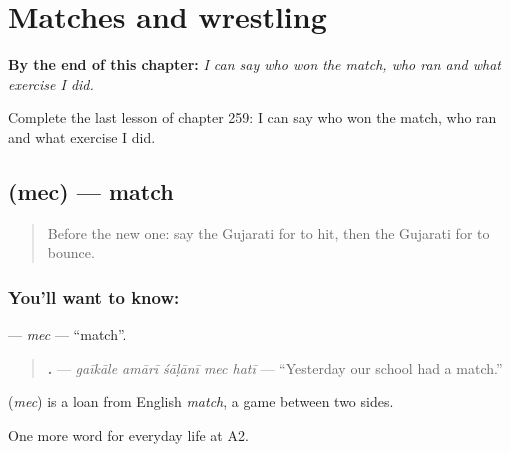 
\chapter{Matches and wrestling}
\label{ch:gu-matches-and-wrestling}

\begin{chapteropening}
\textbf{By the end of this chapter:} \emph{I can say who won the match, who ran and what exercise I did.}

Complete the last lesson of chapter 259: I can say who won the match, who ran and what exercise I did.
\end{chapteropening}

\section[\texorpdfstring{\gu{મેચ} (mec)}{મેચ (mec)}]{ (mec) — match}

\label{lesson:GU-C259-mec}



\begin{quote}
Before the new one: say the Gujarati for to hit, then the Gujarati for to bounce.
\end{quote}

\subsection*{You'll want to know: }
\textbf{} — \emph{mec} — \textquotedblleft{}match\textquotedblright{}.

\begin{quote}
\textbf{    .} — \emph{gaīkāle amārī śāḷānī mec hatī} — \textquotedblleft{}Yesterday our school had a match.\textquotedblright{}
\end{quote}

\begin{cousinweb}
\textbf{} (\emph{mec}) is a loan from English \emph{match}, a game between two sides.
\end{cousinweb}

\begin{grammarlens}[title={What you've built}]
One more word for everyday life at A2.
\end{grammarlens}

